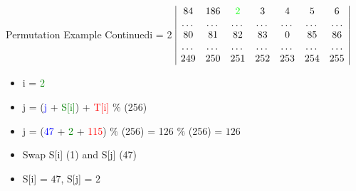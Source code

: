 \documentclass[
	aspectratio=169,	%
	onlytextwidth,		%
	t,					%
	]{beamer}
\begin{document}
\begin{frame}{Permutation Example Continued}{i = 2}
	$\begin{array}{|ccccccc|}
		84 & 186 & \textcolor{green}{2} & 3 & 4 & 5 & 6 \\
		\dots & \dots & \dots & \dots & \dots & \dots & \dots \\
		80 & 81 & 82 & 83 & 0 & 85 & 86 \\
		\dots & \dots & \dots & \dots & \dots & \dots & \dots \\
		249 & 250 & 251 & 252 & 253 & 254 & 255 \\
	\end{array}$
	\begin{itemize}
		\item i = \textcolor{green}{2}
		\item j = (\textcolor{blue} {j} + \textcolor{green}{S[i]}) + \textcolor{red}{T[i]} $\%$ (256)
		\item j = (\textcolor{blue} {47} + \textcolor{green} {2} + \textcolor{red} {115}) $\%$ (256) = 126 $\%$ (256) = $126$
		\item Swap S[i] (1) and S[j] (47)
		\item S[i] = $47$, S[j] = $2$
	\end{itemize}
\end{frame}
\end{document}
